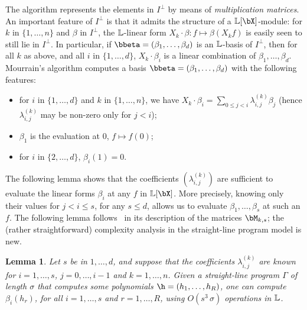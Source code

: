 \documentclass[12pt]{article}
\newtheorem{lemma}[definition]{Lemma}
\begin{document}
The algorithm represents the elements in $I^{\perp}$ by means of {\em
  multiplication matrices}. An important feature of $I^{\perp}$ is
that it admits the structure of a $\LL[\bX]$-module: for $k$ in
$\{1,\dots,n\}$ and $\beta$ in $I^{\perp}$, the $\mathbb{L}$-linear form $X_k
\cdot \beta: f \mapsto \beta(X_k f)$ is easily seen to still lie in
$I^{\perp}$.  In particular, if
$\bbeta=(\beta_1,\dots,\beta_d)$ is an $\mathbb{L}$-basis of
$I^{\perp}$, then for all $k$ as above, and all $i$ in
$\{1,\dots,d\}$, $X_k \cdot \beta_i$ is a linear combination of
$\beta_1,\dots,\beta_d$. Mourrain's algorithm computes a basis
$\bbeta=(\beta_1,\dots,\beta_d)$ with the following features:
\begin{itemize}
\item for $i$ in $\{1,\dots,d\}$ and $k$ in $\{1,\dots,n\}$, we have
  $X_k \cdot \beta_i=\sum_{0 \le j < i} \lambda^{(k)}_{i,j} \beta_j$
  (hence $\lambda^{(k)}_{i,j}$ may be non-zero 
  only for $j<i$);
\item $\beta_1$ is the evaluation at $0$, $f \mapsto f(0)$;
\item for $i$ in $\{2,\dots,d\}$, $\beta_i(1)=0$.
\end{itemize}
The following lemma shows that the coefficients $(\lambda^{(k)}_{i,j})$
are sufficient to evaluate  the linear forms $\beta_i$ at any $f$ in
$\LL[\bX]$. More precisely, knowing only their values for $j < i \le s$,
for any $s \le d$, allows us to evaluate $\beta_1,\dots,\beta_s$ at such an $f$.
The following lemma follows~\cite{Mourrain97} in its description
of the matrices $\bM_{k,s}$; the (rather straightforward) complexity analysis 
in the straight-line program model is new.
\begin{lemma}\label{lemma:evalbeta}
   Let $s$ be in $1,\dots,d$, and suppose that the coefficients
  $\lambda^{(k)}_{i,j}$ are known for $i=1,\dots,s$, $j=0,\dots,i-1$
  and $k=1,\dots,n$. Given a straight-line program $\Gamma$ of length
  $\sigma$ that computes some polynomials $\h=(h_1,\dots,h_R)$, one can compute
  $\beta_i(h_r)$, for all $i=1,\dots,s$ and $r=1,\dots,R$, using
  $O(s^3\,\sigma)$ operations in $\mathbb{L}$.
\end{lemma}
\end{document}
